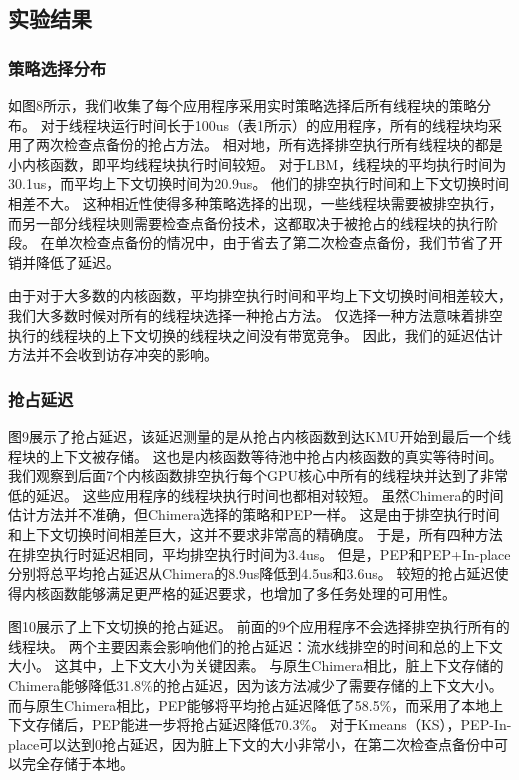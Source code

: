\subsection{实验结果}

\subsubsection{策略选择分布}
如图8所示，我们收集了每个应用程序采用实时策略选择后所有线程块的策略分布。
对于线程块运行时间长于100us（表1所示）的应用程序，所有的线程块均采用了两次检查点备份的抢占方法。
相对地，所有选择排空执行所有线程块的都是小内核函数，即平均线程块执行时间较短。
对于LBM，线程块的平均执行时间为30.1us，而平均上下文切换时间为20.9us。
他们的排空执行时间和上下文切换时间相差不大。
这种相近性使得多种策略选择的出现，一些线程块需要被排空执行，而另一部分线程块则需要检查点备份技术，这都取决于被抢占的线程块的执行阶段。
在单次检查点备份的情况中，由于省去了第二次检查点备份，我们节省了开销并降低了延迟。

由于对于大多数的内核函数，平均排空执行时间和平均上下文切换时间相差较大，我们大多数时候对所有的线程块选择一种抢占方法。
仅选择一种方法意味着排空执行的线程块的上下文切换的线程块之间没有带宽竞争。
因此，我们的延迟估计方法并不会收到访存冲突的影响。

\subsubsection{抢占延迟}

图9展示了抢占延迟，该延迟测量的是从抢占内核函数到达KMU开始到最后一个线程块的上下文被存储。
这也是内核函数等待池中抢占内核函数的真实等待时间。
我们观察到后面7个内核函数排空执行每个GPU核心中所有的线程块并达到了非常低的延迟。
这些应用程序的线程块执行时间也都相对较短。
虽然Chimera的时间估计方法并不准确，但Chimera选择的策略和PEP一样。
这是由于排空执行时间和上下文切换时间相差巨大，这并不要求非常高的精确度。
于是，所有四种方法在排空执行时延迟相同，平均排空执行时间为3.4us。
但是，PEP和PEP+In-place分别将总平均抢占延迟从Chimera的8.9us降低到4.5us和3.6us。
较短的抢占延迟使得内核函数能够满足更严格的延迟要求，也增加了多任务处理的可用性。

图10展示了上下文切换的抢占延迟。
前面的9个应用程序不会选择排空执行所有的线程块。
两个主要因素会影响他们的抢占延迟：流水线排空的时间和总的上下文大小。
这其中，上下文大小为关键因素。
与原生Chimera相比，脏上下文存储的Chimera能够降低31.8\%的抢占延迟，因为该方法减少了需要存储的上下文大小。
而与原生Chimera相比，PEP能够将平均抢占延迟降低了58.5\%，而采用了本地上下文存储后，PEP能进一步将抢占延迟降低70.3\%。
对于Kmeans（KS），PEP-In-place可以达到0抢占延迟，因为脏上下文的大小非常小，在第二次检查点备份中可以完全存储于本地。

